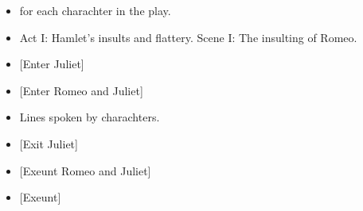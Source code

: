 \documentclass[a0paper,fontscale=0.285]{baposter} %
\newcommand{\compresslist}{ %
\setlength{\itemsep}{1pt}
\setlength{\parskip}{0pt}
\setlength{\parsep}{0pt}
}
\begin{document}
\begin{poster}
{\colorbox[HTML]{CCFFFF}{}
\begin{itemize}\compresslist
\item <Name, Description> for each charachter in the play.
\end{itemize}

\colorbox[HTML]{CCFFFF}{}
\begin{itemize}\compresslist
\item Act I: Hamlet's insults and flattery. \newline
Scene I: The insulting of Romeo.
\end{itemize}


\colorbox[HTML]{CCFFFF}{}
\begin{itemize}\compresslist
\item {[Enter Juliet]} 
\item {[Enter Romeo and Juliet]}
\end{itemize}
\colorbox[HTML]{CCFFFF}{}
\begin{itemize}\compresslist
\item Lines spoken by charachters.
\end{itemize}
\colorbox[HTML]{CCFFFF}{}
\begin{itemize}\compresslist
\item {[Exit Juliet]} 
\item {[Exeunt  Romeo and Juliet]}
\item {[Exeunt]}
\end{itemize}




\vspace{8.0em} %
}


\end{poster}
\end{document}
